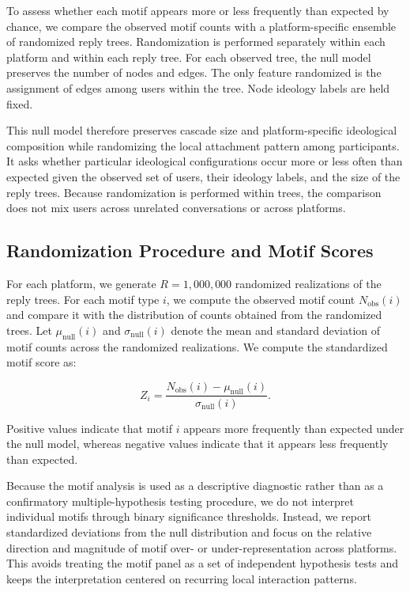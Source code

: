 \documentclass[letterpaper]{article} %
\begin{document}
To assess whether each motif appears more or less frequently than expected by chance, we compare the observed motif counts with a platform-specific ensemble of randomized reply trees. Randomization is performed separately within each platform and within each reply tree. For each observed tree, the null model preserves the number of nodes and edges. The only feature randomized is the assignment of edges among users within the tree. Node ideology labels are held fixed.

This null model therefore preserves cascade size and platform-specific ideological composition while randomizing the local attachment pattern among participants. It asks whether particular ideological configurations occur more or less often than expected given the observed set of users, their ideology labels, and the size of the reply trees. Because randomization is performed within trees, the comparison does not mix users across unrelated conversations or across platforms.
\subsection*{Randomization Procedure and Motif Scores}

For each platform, we generate $R=1{,}000{,}000$ randomized realizations of the reply trees. For each motif type $i$, we compute the observed motif count $N_{\mathrm{obs}}(i)$ and compare it with the distribution of counts obtained from the randomized trees. Let $\mu_{\mathrm{null}}(i)$ and $\sigma_{\mathrm{null}}(i)$ denote the mean and standard deviation of motif counts across the randomized realizations. We compute the standardized motif score as:

\[
Z_i = \frac{N_{\mathrm{obs}}(i) - \mu_{\mathrm{null}}(i)}{\sigma_{\mathrm{null}}(i)}.
\]

Positive values indicate that motif $i$ appears more frequently than expected under the null model, whereas negative values indicate that it appears less frequently than expected.

Because the motif analysis is used as a descriptive diagnostic rather than as a confirmatory multiple-hypothesis testing procedure, we do not interpret individual motifs through binary significance thresholds. Instead, we report standardized deviations from the null distribution and focus on the relative direction and magnitude of motif over- or under-representation across platforms. This avoids treating the motif panel as a set of independent hypothesis tests and keeps the interpretation centered on recurring local interaction patterns.
\end{document}
